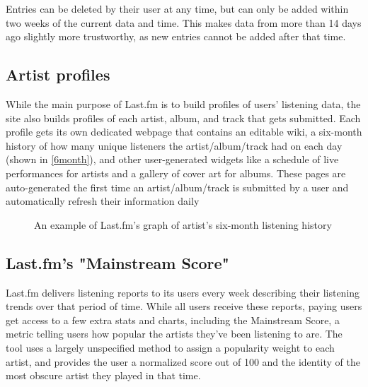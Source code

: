 Entries can be deleted by their user at any time, but can only be added within two weeks of the current data and time. This makes data from more than 14 days ago slightly more trustworthy, as new entries cannot be added after that time.

\subsection{Artist profiles}

While the main purpose of Last.fm is to build profiles of users' listening data, the site also builds profiles of each artist, album, and track that gets submitted. Each profile gets its own dedicated webpage that contains an editable wiki, a six-month history of how many unique listeners the artist/album/track had on each day (shown in \autoref{6month}), and other user-generated widgets like a schedule of live performances for artists and a gallery of cover art for albums. These pages are auto-generated the first time an artist/album/track is submitted by a user and automatically refresh their information daily

\begin{figure}[!ht]
	\begin{center}
		\caption{An example of Last.fm's graph of artist's six-month listening history}\label{6month}
	\end{center}
\end{figure}


\subsection{Last.fm's "Mainstream Score"}

Last.fm delivers listening reports to its users every week describing their listening trends over that period of time. While all users receive these reports, paying users get access to a few extra stats and charts, including the Mainstream Score, a metric telling users how popular the artists they've been listening to are. The tool uses a largely unspecified method to assign a popularity weight to each artist, and provides the user a normalized score out of 100 and the identity of the most obscure artist they played in that time.

